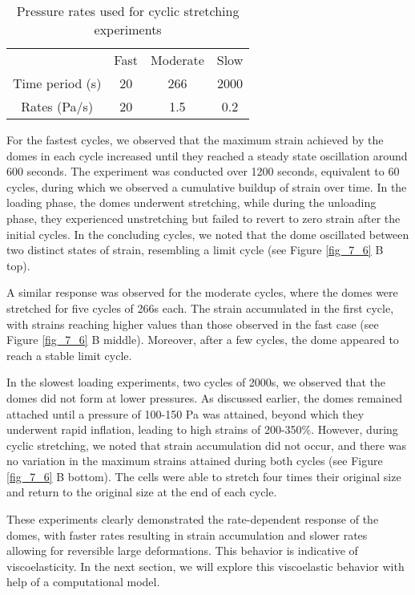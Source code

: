 \begin{center}
	\begin{table}[h!]
		\label{tab:hysteresis}
		\centering
		\begin{tabular}{c c c c}
			& Fast & Moderate & Slow \\ 
			Time period (s) & 20   & 266      & 2000 \\ 
			Rates (Pa/s)    & 20   & 1.5      & 0.2  \\ 
		\end{tabular}
		\caption{Pressure rates used for cyclic stretching experiments}
	\end{table}
\end{center}

For the fastest cycles, we observed that the maximum strain achieved by the domes in each cycle increased until they reached a steady state oscillation around 600 seconds. The experiment was conducted over 1200 seconds, equivalent to 60 cycles, during which we observed a cumulative buildup of strain over time. In the loading phase, the domes underwent stretching, while during the unloading phase, they experienced unstretching but failed to revert to zero strain after the initial cycles. In the concluding cycles, we noted that the dome oscillated between two distinct states of strain, resembling a limit cycle (see Figure \ref{fig_7_6} B top).

A similar response was observed for the moderate cycles, where the domes were stretched for five cycles of 266s each. The strain accumulated in the first cycle, with strains reaching higher values than those observed in the fast case (see Figure \ref{fig_7_6} B middle). Moreover, after a few cycles, the dome appeared to reach a stable limit cycle.

In the slowest loading experiments, two cycles of 2000s, we observed that the domes did not form at lower pressures. As discussed earlier, the domes remained attached until a pressure of 100-150 Pa was attained, beyond which they underwent rapid inflation, leading to high strains of 200-350\%. However, during cyclic stretching, we noted that strain accumulation did not occur, and there was no variation in the maximum strains attained during both cycles (see Figure \ref{fig_7_6} B bottom). The cells were able to stretch four times their original size and return to the original size at the end of each cycle.

These experiments clearly demonstrated the rate-dependent response of the domes, with faster rates resulting in strain accumulation and slower rates allowing for reversible large deformations. This behavior is indicative of viscoelasticity. In the next section, we will explore this viscoelastic behavior with help of a computational model.


